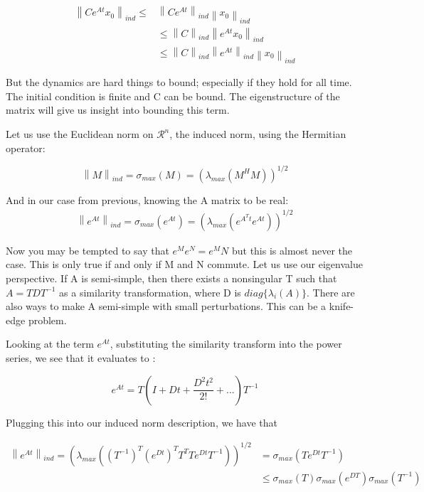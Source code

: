 \documentclass[11pt]{article}
\newcommand{\norm}[1]{\left\lVert#1\right\rVert}
\begin{document}
\begin{align}
\norm{Ce^{At}x_0}_{ind} \leq & \norm{Ce^{At}}_{ind}\norm{x_0}_{ind} \\ 
& \leq \norm{C}_{ind} \norm{e^{At}x_0}_{ind} \\
& \leq \norm{C}_{ind} \norm{e^{At}}_{ind} \norm{x_0}_{ind}
\end{align}

But the dynamics are hard things to bound; especially if they hold for all time. The initial condition is finite and C can be bound. The eigenstructure of the matrix will give us insight into bounding this term.

Let us use the Euclidean norm on $\mathcal{R}^n$, the induced norm, using the Hermitian operator: 

\begin{equation}
\norm{M}_{ind} = \sigma_{max}(M) = (\lambda_{max}(M^HM))^{1/2}
\end{equation}

And in our case from previous, knowing the A matrix to be real:
\begin{align}
\norm{e^{At}}_{ind} = \sigma_{max}(e^{At}) = (\lambda_{max}(e^{A^Tt}e^{At}))^{1/2}
\end{align}

Now you may be tempted to say that $e^M e^N = e^MN$ but this is almost never the case. This is only true if and only if M and N commute. Let us use our eigenvalue perspective. If A is semi-simple, then there exists a nonsingular T such that $A = TDT^{-1}$ as a similarity transformation, where D is $diag\{ \lambda_i(A) \}$. There are also ways to make A semi-simple with small perturbations. This can be a knife-edge problem.

Looking at the term $e^{At}$, substituting the similarity transform into the power series, we see that it evaluates to : 

\begin{equation}
e^{At} = T(I + Dt + \frac{D^2t^2}{2!}+ ...)T^{-1}
\end{equation}

Plugging this into our induced norm description, we have that 

\begin{align}
\norm{e^{At}}_{ind} =(\lambda_{max}((T^{-1})^T(e^{Dt})^TT^TTe^{Dt}T^{-1}))^{1/2} & = \sigma_{max}(Te^{Dt}T^{-1}) \\
& \leq \sigma_{max}(T)\sigma_{max}(e^{DT})\sigma_{max}(T^{-1})
\end{align}
\end{document}
